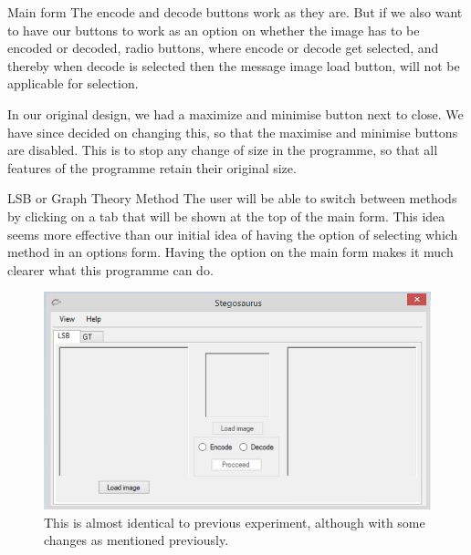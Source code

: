 \begin{description}
\item{Main form}
The encode and decode buttons work as they are. But if we also want to have our buttons to work as an option on whether the image has to be encoded or decoded, radio buttons, where encode or decode get selected, and thereby when decode is selected then the message image load button, will not be applicable for selection. 

In our original design, we had a maximize and minimise button next to close. We have since decided on changing this, so that the maximise and minimise buttons are disabled. This is to stop any change of size in the programme, so that all features of the programme retain their original size.

\item{LSB or Graph Theory Method}
The user will be able to switch between methods by clicking on a tab that will be shown at the top of the main form. This idea seems more effective than our initial idea of having the option of selecting which method in an options form. Having the option on the main form makes it much clearer what this programme can do.

\begin{figure}
	\centering
	\includegraphics[width=1\textwidth]{figures/StegoLSBMain.png}
	\caption{This is almost identical to previous experiment, although with some changes as mentioned previously.}
	\label{fig:StegoLSBMain}
\end{figure}


\end{description}
